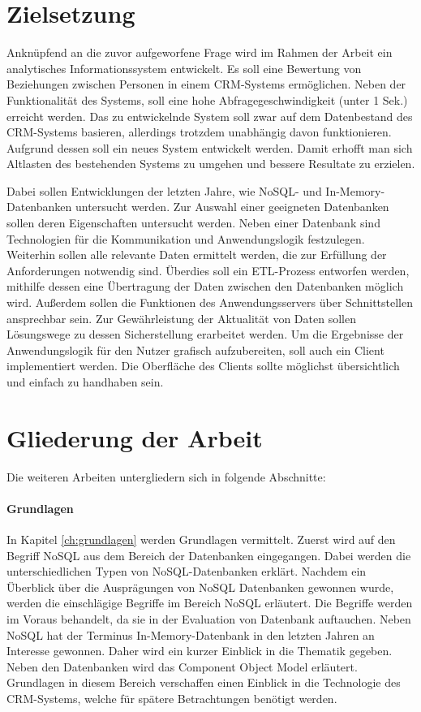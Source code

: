 \section{Zielsetzung}
\label{ch:Einfuehrung:sec:Zielsetzung}

Anknüpfend an die zuvor aufgeworfene Frage wird im Rahmen der Arbeit ein analytisches Informationssystem entwickelt. Es soll eine Bewertung von Beziehungen zwischen Personen in einem CRM-Systems ermöglichen. Neben der Funktionalität des Systems, soll eine hohe Abfragegeschwindigkeit (unter 1 Sek.) erreicht werden. Das zu entwickelnde System soll zwar auf dem Datenbestand des CRM-Systems basieren, allerdings trotzdem unabhängig davon funktionieren. Aufgrund dessen soll ein neues System entwickelt werden. Damit erhofft man sich Altlasten des bestehenden Systems zu umgehen und bessere Resultate zu erzielen. 

Dabei sollen Entwicklungen der letzten Jahre, wie NoSQL- und In-Memory-Datenbanken  untersucht werden. Zur Auswahl einer geeigneten Datenbanken sollen deren Eigenschaften untersucht werden. Neben einer Datenbank sind Technologien für die Kommunikation und Anwendungslogik festzulegen. Weiterhin sollen alle relevante Daten ermittelt werden, die zur Erfüllung der Anforderungen notwendig sind. Überdies soll ein ETL-Prozess entworfen werden, mithilfe dessen eine Übertragung der Daten zwischen den Datenbanken möglich wird. Außerdem sollen die Funktionen des Anwendungsservers über Schnittstellen ansprechbar sein. Zur Gewährleistung der Aktualität von Daten sollen Lösungswege zu dessen Sicherstellung erarbeitet werden. Um die Ergebnisse der Anwendungslogik für den Nutzer grafisch aufzubereiten, soll auch ein Client implementiert werden. Die Oberfläche des Clients sollte möglichst übersichtlich und einfach zu handhaben sein.

\section{Gliederung der Arbeit}
\label{ch:Einfuehrung:sec:Gliederung}

Die weiteren Arbeiten untergliedern sich in folgende Abschnitte: 
 
\paragraph{Grundlagen} In Kapitel \ref{ch:grundlagen} werden Grundlagen vermittelt. Zuerst wird auf den Begriff NoSQL aus dem Bereich der Datenbanken eingegangen. Dabei werden die unterschiedlichen Typen von NoSQL-Datenbanken erklärt. Nachdem ein Überblick über die Ausprägungen von NoSQL Datenbanken gewonnen wurde, werden die einschlägige Begriffe im Bereich NoSQL erläutert. Die Begriffe werden im Voraus behandelt, da sie in der Evaluation von Datenbank auftauchen. Neben NoSQL hat der Terminus In-Memory-Datenbank in den letzten Jahren an Interesse gewonnen. Daher wird ein kurzer Einblick in die Thematik gegeben. Neben den Datenbanken wird das Component Object Model erläutert. Grundlagen in diesem Bereich verschaffen einen Einblick in die Technologie des CRM-Systems, welche für spätere Betrachtungen benötigt werden. 

